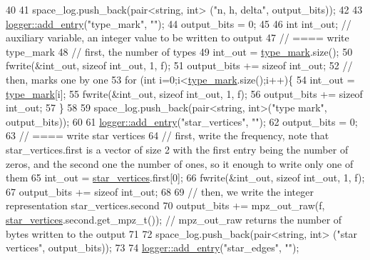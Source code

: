 \begin{DoxyCode}
40 
41   space\_log.push\_back(pair<string, int> (\textcolor{stringliteral}{"n, h, delta"}, output\_bits));
42 
43   \hyperlink{classlogger_a710163deb17bc81f70d53d285b8ac9ac}{logger::add\_entry}(\textcolor{stringliteral}{"type\_mark"}, \textcolor{stringliteral}{""});
44   output\_bits = 0;
45 
46   \textcolor{keywordtype}{int} int\_out; \textcolor{comment}{// auxiliary variable, an integer value to be written to output}
47   \textcolor{comment}{// ==== write type\_mark}
48   \textcolor{comment}{// first, the number of types}
49   int\_out = \hyperlink{classmarked__graph__compressed_a86b00223525703e973415cbc9c94da68}{type\_mark}.size();
50   fwrite(&int\_out, \textcolor{keyword}{sizeof} int\_out, 1, f);
51   output\_bits += \textcolor{keyword}{sizeof} int\_out;
52   \textcolor{comment}{// then, marks one by one}
53   \textcolor{keywordflow}{for} (\textcolor{keywordtype}{int} i=0;i<\hyperlink{classmarked__graph__compressed_a86b00223525703e973415cbc9c94da68}{type\_mark}.size();i++)\{
54     int\_out = \hyperlink{classmarked__graph__compressed_a86b00223525703e973415cbc9c94da68}{type\_mark}[i];
55     fwrite(&int\_out, \textcolor{keyword}{sizeof} int\_out, 1, f);
56     output\_bits += \textcolor{keyword}{sizeof} int\_out;
57   \}
58 
59   space\_log.push\_back(pair<string, int>(\textcolor{stringliteral}{"type mark"}, output\_bits));
60 
61   \hyperlink{classlogger_a710163deb17bc81f70d53d285b8ac9ac}{logger::add\_entry}(\textcolor{stringliteral}{"star\_vertices"}, \textcolor{stringliteral}{""});
62   output\_bits = 0;
63   \textcolor{comment}{// ==== write star vertices}
64   \textcolor{comment}{// first, write the frequency, note that star\_vertices.first is a vector of size 2 with the first entry
       being the number of zeros, and the second one the number of ones, so it enough to write only one of them}
65   int\_out = \hyperlink{classmarked__graph__compressed_a7a4ced4586e2e353f9076bd447df5208}{star\_vertices}.first[0];
66   fwrite(&int\_out, \textcolor{keyword}{sizeof} int\_out, 1, f);
67   output\_bits += \textcolor{keyword}{sizeof} int\_out;
68 
69   \textcolor{comment}{// then, we write the integer representation star\_vertices.second}
70   output\_bits +=  mpz\_out\_raw(f, \hyperlink{classmarked__graph__compressed_a7a4ced4586e2e353f9076bd447df5208}{star\_vertices}.second.get\_mpz\_t()); \textcolor{comment}{// mpz\_out\_raw returns the
       number of bytes written to the output}
71 
72   space\_log.push\_back(pair<string, int> (\textcolor{stringliteral}{"star vertices"}, output\_bits));
73 
74   \hyperlink{classlogger_a710163deb17bc81f70d53d285b8ac9ac}{logger::add\_entry}(\textcolor{stringliteral}{"star\_edges"}, \textcolor{stringliteral}{""});

\end{DoxyCode}
